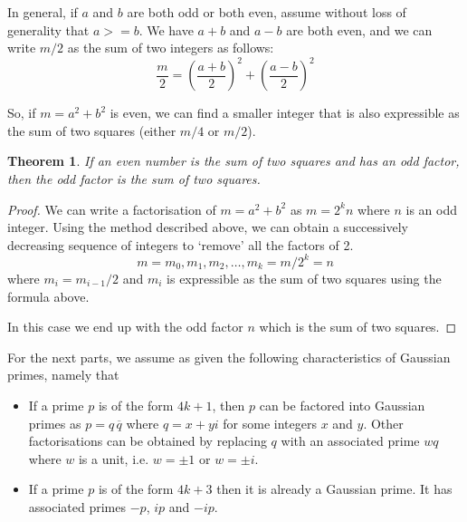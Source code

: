 \documentclass[11pt]{amsart}
\newtheorem{theorem}{Theorem}[section]
\begin{document}
\vspace{1em}

In general, if $a$ and $b$ are both odd or both even, assume without loss of generality that $a >= b$. We have $a+b$ and $a-b$ are both even, and we can write $m/2$ as the sum of two integers as follows:
$$
\frac{m}{2} = \left(\frac{a+b}{2}\right)^2 + \left(\frac{a-b}{2}\right)^2
$$


\vspace{1em}

So, if $m = a^2 + b^2$ is even, we can find a smaller integer that is also expressible as the sum of two squares (either $m/4$ or $m/2$).


\vspace{1em}

\begin{theorem}
If an even number is the sum of two squares and has an odd factor, then the odd factor is the sum of two squares.
\end{theorem}

\begin{proof}
We can write a factorisation of $m = a^2 + b^2$ as $m = 2^k n$ where $n$ is an odd integer.
Using the method described above, we can obtain a successively decreasing sequence of integers to `remove' all the factors of 2.
$$
m = m_0 , m_1, m_2, \ldots, m_k = m/2^{k} =  n
$$
where $m_i = m_{i-1}/2$ and $m_{i}$ is expressible as the sum of two squares using the formula above.


In this case we end up with the odd factor $n$ which is the sum of two squares.


\end{proof}

\vspace{1em}

For the next parts, we assume as given the following characteristics of Gaussian primes, namely that
\begin{itemize}
\item
If a prime $p$ is of the form $4k+1$, then $p$ can be factored into Gaussian primes as $p = q \, \overline{q}$  where $q = x + y i$ for some integers $x$ and $y$. Other factorisations can be obtained by replacing $q$ with an associated prime $w q$ where $w$ is a unit, i.e. $w = \pm 1$ or $w = \pm i$.
\item
If a prime $p$ is of the form $4 k + 3$ then it is already a Gaussian prime. It has associated primes $-p$, $ip$ and $-ip$.
\end{itemize}
\end{document}
